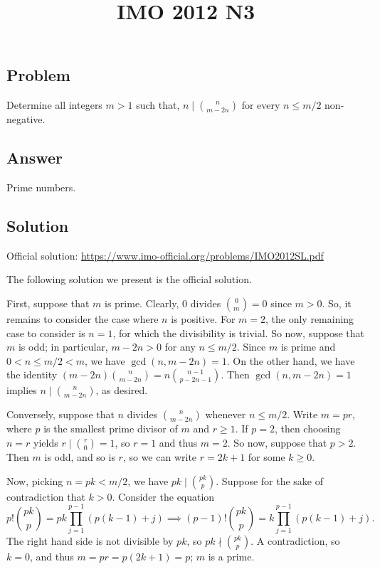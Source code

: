 \documentclass{article}
\title{IMO 2012 N3}
\author{}
\date{}
\begin{document}
\maketitle



\subsection*{Problem}

Determine all integers $m > 1$ such that, $n \mid \binom{n}{m - 2n}$ for every $n \leq m/2$ non-negative.



\subsection*{Answer}

Prime numbers.



\subsection*{Solution}

Official solution: \url{https://www.imo-official.org/problems/IMO2012SL.pdf}

The following solution we present is the official solution.

First, suppose that $m$ is prime.
Clearly, $0$ divides $\binom{0}{m} = 0$ since $m > 0$.
So, it remains to consider the case where $n$ is positive.
For $m = 2$, the only remaining case to consider is $n = 1$, for which the divisibility is trivial.
So now, suppose that $m$ is odd; in particular, $m - 2n > 0$ for any $n \leq m/2$.
Since $m$ is prime and $0 < n \leq m/2 < m$, we have $\gcd(n, m - 2n) = 1$.
On the other hand, we have the identity $(m - 2n) \binom{n}{m - 2n} = n \binom{n - 1}{p - 2n - 1}$.
Then $\gcd(n, m - 2n) = 1$ implies $n \mid \binom{n}{m - 2n}$, as desired.

Conversely, suppose that $n$ divides $\binom{n}{m - 2n}$ whenever $n \leq m/2$.
Write $m = pr$, where $p$ is the smallest prime divisor of $m$ and $r \geq 1$.
If $p = 2$, then choosing $n = r$ yields $r \mid \binom{r}{0} = 1$, so $r = 1$ and thus $m = 2$.
So now, suppose that $p > 2$.
Then $m$ is odd, and so is $r$, so we can write $r = 2k + 1$ for some $k \geq 0$.

Now, picking $n = pk < m/2$, we have $pk \mid \binom{pk}{p}$.
Suppose for the sake of contradiction that $k > 0$.
Consider the equation
\[ p! \binom{pk}{p} = pk \prod_{j = 1}^{p - 1} (p(k - 1) + j) \implies (p - 1)! \binom{pk}{p} = k \prod_{j = 1}^{p - 1} (p(k - 1) + j). \]
The right hand side is not divisible by $pk$, so $pk \nmid \binom{pk}{p}$.
A contradiction, so $k = 0$, and thus $m = pr = p(2k + 1) = p$; $m$ is a prime.
\end{document}
